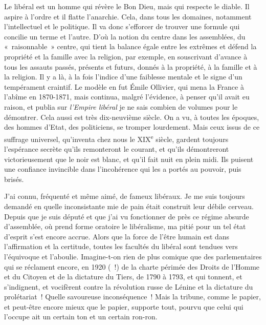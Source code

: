 \documentclass[french,twoside]{book} %
\begin{document}
Le libéral est un homme qui révère le Bon Dieu, mais qui respecte le diable. Il aspire à l’ordre et il flatte l’anarchie. Cela, dans tous les domaines, notamment l’intellectuel et le politique. Il va donc s’efforcer de trouver une formule qui concilie un terme et l’autre. D’où la notion du centre dans les assemblées, du « raisonnable » centre, qui tient la balance égale entre les extrêmes et défend la propriété et la famille avec la religion, par exemple, en souscrivant d’avance à tous les assauts passés, présents et futurs, donnés à la propriété, à la famille et à la religion. Il y a là, à la fois l’indice d’une faiblesse mentale et le signe d’un tempérament craintif. Le modèle en fut Émile Ollivier, qui mena la France à l’abîme en 1870-1871, mais continua, malgré l’évidence, à penser qu’il avait eu raison, et publia sur {\itshape l’Empire libéral} je ne sais combien de volumes pour le démontrer. Cela aussi est très dix-neuvième siècle. On a vu, à toutes les époques, des hommes d’Etat, des politiciens, se tromper lourdement. Mais ceux issus de ce suffrage universel, qu’inventa chez nous le XIX\textsuperscript{e} siècle, gardent toujours l’espérance secrète qu’ils remonteront le courant, et qu’ils démontreront victorieusement que le noir est blanc, et qu’il fait nuit en plein midi. Ils puisent une confiance invincible dans l’incohérence qui les a portés au pouvoir, puis brisés.\par
J’ai connu, fréquenté et même aimé, de fameux libéraux. Je me suis toujours demandé en quelle inconsistante mie de pain était construit leur débile cerveau. Depuis que je suis député et que j’ai vu fonctionner de près ce régime absurde d’assemblée, où prend forme oratoire le libéralisme, ma pitié pour un tel état d’esprit s’est encore accrue. Alors que la force de l’être humain est dans l’affirmation et la certitude, toutes les facultés du libéral sont tendues vers l’équivoque et l’aboulie. Imagine-t-on rien de plus comique que des parlementaires qui se réclament encore, en 1920 ( !) de la charte périmée des Droits de l’Homme et du Citoyen et de la dictature du Tiers, de 1790 à 1793, et qui tonnent, et s’indignent, et vocifèrent contre la révolution russe de Lénine et la dictature du prolétariat ! Quelle savoureuse inconséquence ! Mais la tribune, comme le papier, et peut-être encore mieux que le papier, supporte tout, pourvu que celui qui l’occupe ait un certain ton et un certain ron-ron.\par
\end{document}

